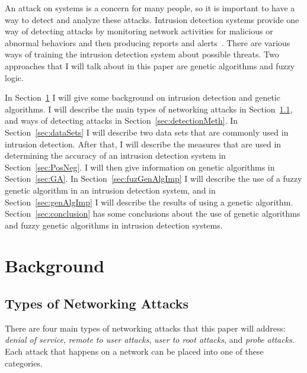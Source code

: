 \documentclass{sig-alternate}
\begin{document}
An attack on systems is a concern for many people, so it is important to have a way to detect and analyze these attacks. Intrusion detection systems provide one way of detecting attacks by monitoring network activities for malicious or abnormal behaviors and then producing reports and alerts~\cite{DBLP:journals/corr/abs-1204-1336}. There are various ways of training the intrusion detection system about possible threats. Two approaches that I will talk about in this paper are genetic algorithms and fuzzy logic.

In Section~\ref{sec:background} I will give some background on intrusion detection and genetic algorithms. I will describe the main types of networking attacks in Section~\ref{sec:typesAttacks}, and ways of detecting attacks in Section~\ref{sec:detectionMeth}. In Section~\ref{sec:dataSets} I will describe two data sets that are commonly used in intrusion detection. After that, I will describe the measures that are used in determining the accuracy of an intrusion detection system in Section~\ref{sec:PosNeg}. I will then give information on genetic algorithms in Section~\ref{sec:GA}. In Section~\ref{sec:fuzGenAlgImp} I will describe the use of a fuzzy genetic algorithm in an intrusion detection system, and in Section~\ref{sec:genAlgImp} I will describe the results of using a genetic algorithm. Section~\ref{sec:conclusion} has some conclusions about the use of genetic algorithms and fuzzy genetic algorithms in intrusion detection systems.




\section{Background}
\label{sec:background}

\subsection{Types of Networking Attacks}
\label{sec:typesAttacks}
There are four main types of networking attacks that this paper will address: \emph{denial of service}, \emph{remote to user attacks}, \emph{user to root attacks}, and \emph{probe attacks}. Each attack that happens on a network can be placed into one of these categories.~\cite{DBLP:journals/corr/abs-1204-1336}
\end{document}
